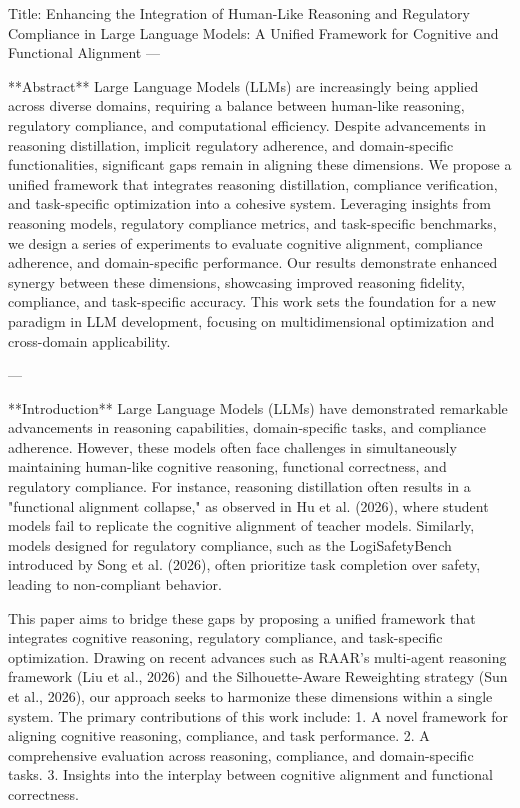 Title: Enhancing the Integration of Human-Like Reasoning and Regulatory Compliance in Large Language Models: A Unified Framework for Cognitive and Functional Alignment  
---

**Abstract**  
Large Language Models (LLMs) are increasingly being applied across diverse domains, requiring a balance between human-like reasoning, regulatory compliance, and computational efficiency. Despite advancements in reasoning distillation, implicit regulatory adherence, and domain-specific functionalities, significant gaps remain in aligning these dimensions. We propose a unified framework that integrates reasoning distillation, compliance verification, and task-specific optimization into a cohesive system. Leveraging insights from reasoning models, regulatory compliance metrics, and task-specific benchmarks, we design a series of experiments to evaluate cognitive alignment, compliance adherence, and domain-specific performance. Our results demonstrate enhanced synergy between these dimensions, showcasing improved reasoning fidelity, compliance, and task-specific accuracy. This work sets the foundation for a new paradigm in LLM development, focusing on multidimensional optimization and cross-domain applicability.

---

**Introduction**  
Large Language Models (LLMs) have demonstrated remarkable advancements in reasoning capabilities, domain-specific tasks, and compliance adherence. However, these models often face challenges in simultaneously maintaining human-like cognitive reasoning, functional correctness, and regulatory compliance. For instance, reasoning distillation often results in a "functional alignment collapse," as observed in Hu et al. (2026), where student models fail to replicate the cognitive alignment of teacher models. Similarly, models designed for regulatory compliance, such as the LogiSafetyBench introduced by Song et al. (2026), often prioritize task completion over safety, leading to non-compliant behavior. 

This paper aims to bridge these gaps by proposing a unified framework that integrates cognitive reasoning, regulatory compliance, and task-specific optimization. Drawing on recent advances such as RAAR's multi-agent reasoning framework (Liu et al., 2026) and the Silhouette-Aware Reweighting strategy (Sun et al., 2026), our approach seeks to harmonize these dimensions within a single system. The primary contributions of this work include:
1. A novel framework for aligning cognitive reasoning, compliance, and task performance.
2. A comprehensive evaluation across reasoning, compliance, and domain-specific tasks.
3. Insights into the interplay between cognitive alignment and functional correctness.

